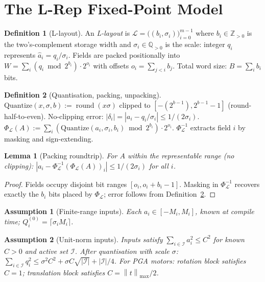 \documentclass[11pt,a4paper]{article}
\theoremstyle{definition}
\newtheorem{definition}{Definition}[section]
\theoremstyle{plain}
\newtheorem{lemma}{Lemma}[section]
\newtheorem{assumption}{Assumption}[section]
\theoremstyle{remark}
\newcommand{\Quantize}{\mathrm{Quantize}}
\newcommand{\Pack}{\Phi_{\mathcal{L}}}
\newcommand{\Unpack}{\Phi^{-1}_{\mathcal{L}}}
\newcommand{\norm}[1]{\left\|#1\right\|}
\begin{document}
\section{The L-Rep Fixed-Point Model}
\label{sec:model}

\begin{definition}[L-layout]
\label{def:layout}
An \emph{L-layout} is $\mathcal{L}=\bigl((b_i,\sigma_i)\bigr)_{i=0}^{m-1}$
where $b_i\in\mathbb{Z}_{>0}$ is the two's-complement storage width and
$\sigma_i\in\mathbb{Q}_{>0}$ is the scale: integer $q_i$ represents
$\hat{a}_i=q_i/\sigma_i$.
Fields are packed positionally into $W=\sum_i(q_i\bmod2^{b_i})\cdot2^{o_i}$
with offsets $o_i=\sum_{j<i}b_j$.
Total word size: $B=\sum_i b_i$ bits.
\end{definition}

\begin{definition}[Quantisation, packing, unpacking]
\label{def:quantize}
$\Quantize(x,\sigma,b):=\operatorname{round}(x\sigma)$ clipped to
$[-(2^{b-1}),2^{b-1}-1]$ (round-half-to-even).
No-clipping error: $|\delta_i|=|a_i-q_i/\sigma_i|\le1/(2\sigma_i)$.
$\Pack(A):=\sum_i(\Quantize(a_i,\sigma_i,b_i)\bmod2^{b_i})\cdot2^{o_i}$.
$\Unpack$ extracts field $i$ by masking and sign-extending.
\end{definition}

\begin{lemma}[Packing roundtrip]
\label{lem:pack}
For $A$ within the representable range (no clipping):
$|a_i - \Unpack(\Pack(A))_i|\le1/(2\sigma_i)$ for all $i$.
\end{lemma}
\begin{proof}
Fields occupy disjoint bit ranges $[o_i,o_i+b_i-1]$.
Masking in $\Unpack$ recovers exactly the $b_i$ bits placed by $\Pack$;
error follows from Definition~\ref{def:quantize}.
\end{proof}

\begin{assumption}[Finite-range inputs]
\label{ass:range}
Each $a_i\in[-M_i,M_i]$, known at compile time;
$Q_i^{(0)}=\lceil\sigma_i M_i\rceil$.
\end{assumption}

\begin{assumption}[Unit-norm inputs]
\label{ass:motor}
Inputs satisfy $\sum_{i\in\mathcal{I}}a_i^2\le C^2$ for known $C>0$
and active set $\mathcal{I}$.
After quantisation with scale $\sigma$:
$\sum_{i\in\mathcal{I}}q_i^2\le\sigma^2C^2+\sigma C\sqrt{|\mathcal{I}|}+|\mathcal{I}|/4$.
For PGA motors: rotation block satisfies $C=1$; translation block
satisfies $C=\norm{t}_{\max}/2$.
\end{assumption}
\end{document}
